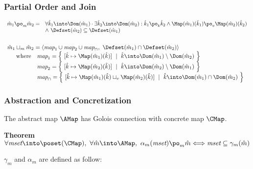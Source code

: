 \subsubsection{Partial Order and Join}
$\begin{array}{rl}
\hat{m}_1 \po_m \hat{m}_2 = & 
\forall \hat{k}_1 \into \Dom(\hat{m}_1) \cdot
\exists \hat{k}_2 \into \Dom(\hat{m}_2) :
\hat{k}_1 \po_k \hat{k}_2
\land \Map(\hat{m}_1)(\hat{k}_1) \po_v \Map(\hat{m}_2)(\hat{k}_2) \\
& \land\ \Defset(\hat{m}_2) \subseteq \Defset(\hat{m}_1) \\
\end{array}$\\\\
$\begin{array}{l}
\hat{m}_1 \sqcup_m \hat{m}_2 =
\langle \emph{map}_1 \cup \emph{map}_2 \cup \emph{map}_{\cap},\
\Defset(\hat{m}_1) \cap \Defset(\hat{m}_2) \rangle \\
\quad \begin{array}{rl} \textrm{where} 
& \emph{map}_1 = \left \{~ [ \hat{k} \mapsto \Map(\hat{m}_1)(\hat{k}) ] ~\mid~
\hat{k} \into \Dom(\hat{m}_1)
\setminus \Dom(\hat{m}_2) ~\right \} \\
& \emph{map}_2 = \left \{~ [ \hat{k} \mapsto \Map(\hat{m}_2)(\hat{k}) ] ~\mid~
\hat{k} \into \Dom(\hat{m}_2)
\setminus \Dom(\hat{m}_1) ~\right \} \\
& \emph{map}_{\cap} = \left \{~ [ \hat{k} \mapsto 
\Map(\hat{m}_1)(\hat{k}) \sqcup_v \Map(\hat{m}_2)(\hat{k}) ] ~\mid~
\hat{k} \into \Dom(\hat{m}_1)
\cap \Dom(\hat{m}_2) ~\right \} \\
\end{array} \\
\end{array}$

\subsubsection{Abstraction and Concretization} \label{sec:galois}
The abstract map $\AMap$ has Golois connection with concrete map $\CMap$.
\begin{center}
\textbf{Theorem }
$\forall \emph{mset} \into \poset(\CMap), ~
\forall \hat{m} \into \AMap, ~
\alpha_m(\emph{mset}) \po_m \hat{m}
\Longleftrightarrow
\emph{mset} \subseteq \gamma_m(\hat{m})$
\end{center}
$\gamma_m$ and $\alpha_m$ are defined as follow: \\

